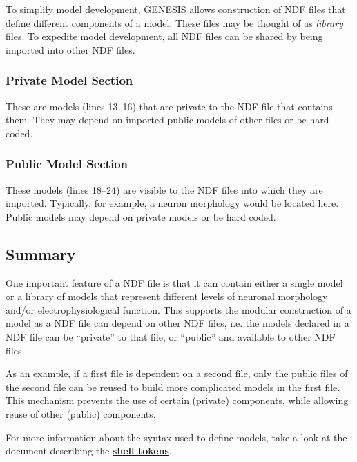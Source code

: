 \documentclass[12pt]{article}
\begin{document}
To simplify model development, GENESIS allows construction of NDF files
that define different components of a model.  These files may be thought of as
\emph{library} files.  To expedite model development, all NDF files
can be shared by being imported into other NDF files.

\subsubsection*{Private Model Section}
These are models (lines 13--16) that are private to the NDF file that contains them.
They may depend on imported public models of other files or be hard
coded.

\subsubsection*{Public Model Section}
These models (lines 18--24) are visible to the NDF files into which they are
imported.  Typically, for example, a neuron morphology would be
located here.  Public models may depend on private models or be hard
coded.

\subsection*{Summary}
One important feature of a NDF file is that it can contain either a single model or a library of models that represent different levels of neuronal morphology and/or electrophysiological function. This supports the modular construction of a model as a NDF file can depend on other NDF files, i.e. the models declared in a NDF file can be ``private'' to that file, or ``public'' and available to other NDF files. 

As an example, if a first file is dependent on a second file, only the public files of the second file can be reused to build more complicated models in the first file. This mechanism prevents the use of certain (private) components, while allowing reuse of other (public) components.

For more information about the syntax used to define models, take a
look at the document describing the
\href{../shell-tokens/shell-tokens.tex}{\bf shell tokens}.


\end{document}
